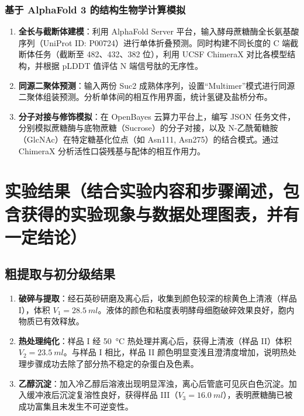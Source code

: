 \documentclass[10.5pt, a4paper]{ctexart}
\begin{document}
\subsubsection{基于 AlphaFold 3 的结构生物学计算模拟}

\begin{enumerate}
    \item \textbf{全长与截断体建模}：利用 AlphaFold Server 平台，输入酵母蔗糖酶全长氨基酸序列（UniProt ID: P00724）进行单体折叠预测。同时构建不同长度的 C 端截断体任务（截断至 482、432、382 位），利用 UCSF ChimeraX 对比各模型结构，并根据 pLDDT 值评估 N 端信号肽的无序性。
    \item \textbf{同源二聚体预测}：输入两份 Suc2 成熟体序列，设置“Multimer”模式进行同源二聚体组装预测。分析单体间的相互作用界面，统计氢键及盐桥分布。
    \item \textbf{分子对接与修饰模拟}：在 OpenBayes 云算力平台上，编写 JSON 任务文件，分别模拟蔗糖酶与底物蔗糖（Sucrose）的分子对接，以及 N-乙酰葡糖胺（GlcNAc）在特定糖基化位点（如 Asn111, Asn275）的结合模式。通过 ChimeraX 分析活性口袋残基与配体的相互作用力。
\end{enumerate}

\section{实验结果（结合实验内容和步骤阐述，包含获得的实验现象与数据处理图表，并有一定结论）}

\subsection{粗提取与初分级结果}

\begin{enumerate}
    \item \textbf{破碎与提取}：经石英砂研磨及离心后，收集到颜色较深的棕黄色上清液（样品 I），体积 $V_1 = \SI{28.5}{ml}$。液体的颜色和粘度表明酵母细胞破碎效果良好，胞内物质已有效释放。
    \item \textbf{热处理纯化}：样品 I 经 \SI{50}{\celsius} 热处理并离心后，获得上清液（样品 II）体积 $V_2 = \SI{23.5}{ml}$。与样品 I 相比，样品 II 颜色明显变浅且澄清度增加，说明热处理步骤成功去除了部分热不稳定的杂蛋白及色素。
    \item \textbf{乙醇沉淀}：加入冷乙醇后溶液出现明显浑浊，离心后管底可见灰白色沉淀。加入缓冲液后沉淀复溶性良好，获得样品 III（$V_3 = \SI{16.0}{ml}$），表明蔗糖酶已被成功富集且未发生不可逆变性。
\end{enumerate}
\end{document}
